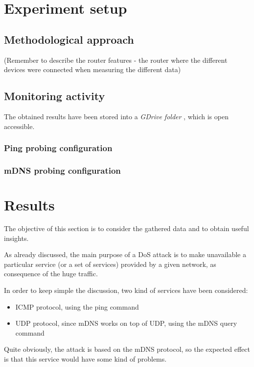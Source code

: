 \documentclass[fleqn, 11pt]{SelfArx} %
\begin{document}
\section{Experiment setup}
\subsection{Methodological approach}
(Remember to describe the router features - the router where the different devices were connected when measuring the different data)
\subsection{Monitoring activity}
The obtained results have been stored into a {\it{GDrive folder}} \cite{GDrive}, which is open accessible.
\subsubsection{Ping probing configuration}
\subsubsection{mDNS probing configuration}


\section{Results}
The objective of this section is to consider the gathered data and to obtain useful insights.

As already discussed, the main purpose of a DoS attack is to make unavailable a particular service (or a set of services) provided by a given network, as consequence of the huge traffic.

In order to keep simple the discussion, two kind of services have been considered:
\begin{itemize}[leftmargin=*]
	\item ICMP protocol, using the ping command
 	\item UDP protocol, since mDNS works on top of UDP, using the mDNS query command
\end{itemize}

Quite obviously, the attack is based on the mDNS protocol, so the expected effect is that this service would have some kind of problems.
\end{document}
